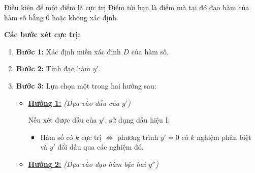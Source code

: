 \begin{lythuyetbox}{Điều kiện để một điểm là cực trị}
Điểm tới hạn là điểm mà tại đó đạo hàm của hàm số bằng 0 hoặc không xác định.

\vspace{1em}
\textbf{Các bước xét cực trị:}

\begin{enumerate}
    \item \textbf{Bước 1:} Xác định miền xác định $D$ của hàm số.
    \item \textbf{Bước 2:} Tính đạo hàm $y'$.
    \item \textbf{Bước 3:} Lựa chọn một trong hai hướng sau:
    \begin{itemize}
        \item[] \textbf{\underline{Hướng 1:}} \textit{(Dựa vào dấu của $y'$)}
        
        Nếu xét được dấu của $y'$, sử dụng dấu hiệu I:
        \begin{itemize}
            \item Hàm số có $k$ cực trị $\Leftrightarrow$ phương trình $y' = 0$ có $k$ nghiệm phân biệt và $y'$ đổi dấu qua các nghiệm đó.
        \end{itemize}
        
        \vspace{0.5em}
        \item[] \textbf{\underline{Hướng 2:}} \textit{(Dựa vào đạo hàm bậc hai $y''$)}
        

\end{itemize}
\end{enumerate}
\end{lythuyetbox}
